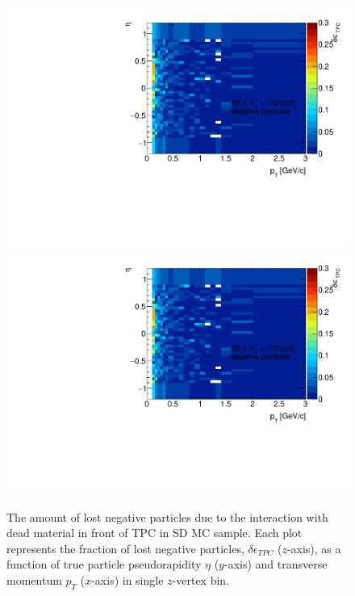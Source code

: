 \begin{figure}[H]
	\caption[The amount of lost negative particles due to the interaction with dead material in front of TPC as a function of $p_T$, $\eta$ and $z$-vertex in SD]{The amount of lost negative particles due to the interaction with dead material in front of TPC in SD MC sample. Each plot represents the fraction of lost negative particles, $\delta\epsilon_{ TPC}$ ($z$-axis), as a function of true particle pseudorapidity $\eta$ ($y$-axis) and transverse momentum $p_{T}$ ($x$-axis) in single $z$-vertex bin.}\label{fig:dead_materialSD3Dnegative}
	\parbox{0.325\textwidth}{
		\includegraphics[width=\linewidth,page=1]{graphics/systematicsEfficiency/deadMaterial/secondaries_Unbinned_Charged_SD.pdf}\\
		\includegraphics[width=\linewidth,page=4]{graphics/systematicsEfficiency/deadMaterial/secondaries_Unbinned_Charged_SD.pdf}\\
}
\end{figure}
